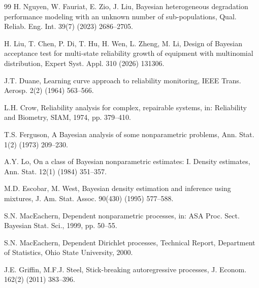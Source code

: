 \documentclass[a4paper,fleqn,longmktitle]{cas-sc}
\begin{document}
\begin{thebibliography}{99}
H. Nguyen, W. Fauriat, E. Zio, J. Liu, Bayesian heterogeneous degradation performance modeling with an unknown number of sub-populations, Qual. Reliab. Eng. Int. 39(7) (2023) 2686--2705.





H. Liu, T. Chen, P. Di, T. Hu, H. Wen, L. Zheng, M. Li, Design of Bayesian acceptance test for multi-state reliability growth of equipment with multinomial distribution, Expert Syst. Appl. 310 (2026) 131306.





J.T. Duane, Learning curve approach to reliability monitoring, IEEE Trans. Aerosp. 2(2) (1964) 563--566.





L.H. Crow, Reliability analysis for complex, repairable systems, in: Reliability and Biometry, SIAM, 1974, pp. 379--410.





T.S. Ferguson, A Bayesian analysis of some nonparametric problems, Ann. Stat. 1(2) (1973) 209--230.





A.Y. Lo, On a class of Bayesian nonparametric estimates: I. Density estimates, Ann. Stat. 12(1) (1984) 351--357.





M.D. Escobar, M. West, Bayesian density estimation and inference using mixtures, J. Am. Stat. Assoc. 90(430) (1995) 577--588.





S.N. MacEachern, Dependent nonparametric processes, in: ASA Proc. Sect. Bayesian Stat. Sci., 1999, pp. 50--55.





S.N. MacEachern, Dependent Dirichlet processes, Technical Report, Department of Statistics, Ohio State University, 2000.





J.E. Griffin, M.F.J. Steel, Stick-breaking autoregressive processes, J. Econom. 162(2) (2011) 383--396.






\end{thebibliography}
\end{document}
